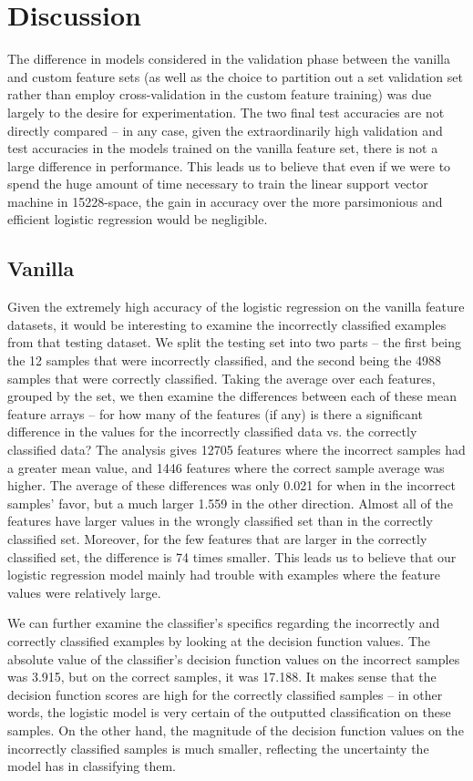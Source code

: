 \documentclass{article} %
\begin{document}
\section{Discussion}
The difference in models considered in the validation phase between the vanilla and custom feature sets (as well as the choice to partition out a set validation set rather than employ cross-validation in the custom feature training) was due largely to the desire for experimentation.  The two final test accuracies are not directly compared -- in any case, given the extraordinarily high validation and test accuracies in the models trained on the vanilla feature set, there is not a large difference in performance.  This leads us to believe that even if we were to spend the huge amount of time necessary to train the linear support vector machine in 15228-space, the gain in accuracy over the more parsimonious and efficient logistic regression would be negligible.
\subsection{Vanilla}
Given the extremely high accuracy of the logistic regression on the vanilla feature datasets, it would be interesting to examine the incorrectly classified examples from that testing dataset.  We split the testing set into two parts -- the first being the 12 samples that were incorrectly classified, and the second being the 4988 samples that were correctly classified.  Taking the average over each features, grouped by the set, we then examine the differences between each of these mean feature arrays -- for how many of the features (if any) is there a significant difference in the values for the incorrectly classified data vs. the correctly classified data?  The analysis gives 12705 features where the incorrect samples had a greater mean value, and 1446 features where the correct sample average was higher.  The average of these differences was only 0.021 for when in the incorrect samples' favor, but a much larger 1.559 in the other direction.  Almost all of the features have larger values in the wrongly classified set than in the correctly classified set.  Moreover, for the few features that are larger in the correctly classified set, the difference is 74 times smaller.  This leads us to believe that our logistic regression model mainly had trouble with examples where the feature values were relatively large.\par 
We can further examine the classifier's specifics regarding the incorrectly and correctly classified examples by looking at the decision function values.  The absolute value of the classifier's decision function values on the incorrect samples was 3.915, but on the correct samples, it was 17.188.  It makes sense that the decision function scores are high for the correctly classified samples -- in other words, the logistic model is very certain of the outputted classification on these samples.  On the other hand, the magnitude of the decision function values on the incorrectly classified samples is much smaller, reflecting the uncertainty the model has in classifying them.
\end{document}
